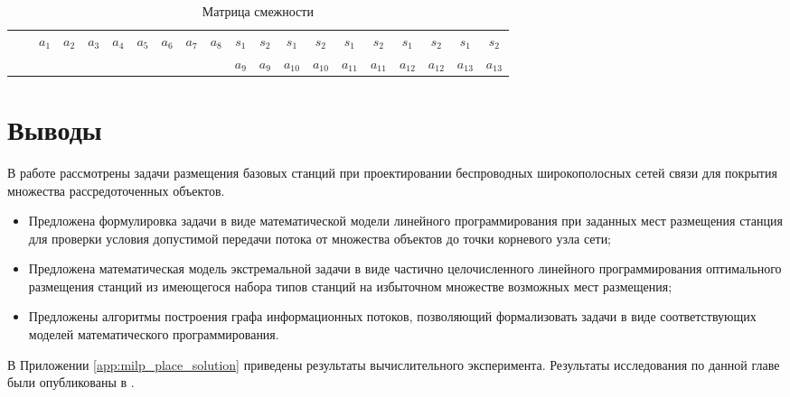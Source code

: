 \fontsize{10pt}{10pt}\selectfont
\begin{longtable}[c]{| c | c|| c | c | c | c|  c|  c|  c|  c|  c|  c|  c|  c|  c|  c|  c|  c|  c|  c|}
    \caption{Матрица смежности}\label{tab:part3_mip_adj_mat}\\

    \hline
    & &\multirow{2}{*}{$a_1$} &\multirow{2}{*}{$a_2$} &	\multirow{2}{*}{$a_3$}& \multirow{2}{*}{$a_4$}&\multirow{2}{*}{$a_5$} &\multirow{2}{*}{$a_6$} &\multirow{2}{*}{$a_7$} &\multirow{2}{*}{$a_8$} & $s_1$& $s_2$& $s_1$& $s_2$& $s_1$& $s_2$& $s_1$& $s_2$& $s_1$& $s_2$  \\

    & & 	& &	& & & & & &$a_9$& $a_9$&$a_{10}$&$a_{10}$& $a_{11}$& $a_{11}$& $a_{12}$& $a_{12}$& $a_{13}$& $a_{13}$  \\
  
    \hline

    \hline \hline
    \hline
\end{longtable}
\normalsize

\section{Выводы}
В работе рассмотрены задачи размещения базовых станций при проектировании беспроводных широкополосных сетей связи для покрытия множества рассредоточенных объектов. 
\begin{itemize}
    \item Предложена формулировка задачи в виде математической модели линейного программирования при заданных мест размещения станция для проверки условия допустимой передачи потока от множества объектов до точки корневого узла сети;
    \item Предложена математическая модель экстремальной задачи в виде частично целочисленного линейного программирования оптимального размещения станций из имеющегося набора типов станций на избыточном множестве возможных мест размещения;
    
    \item Предложены алгоритмы построения графа информационных потоков, позволяющий формализовать задачи в виде соответствующих моделей математического программирования. 
\end{itemize}


В Приложении \cref{app:milp_place_solution} приведены результаты вычислительного эксперимента. Результаты исследования по данной главе были опубликованы в \cite{MukhtarovPershinGUBKIN2018_RSCI, MukhtarovPershinVSPU2019_RSCI, MukhtarovPershinMLSD2019works_RSCI, MukhtarovPershinMLSD2019materials_RSCI,MukhtarovPershinGUBKIN2019_RSCI}. 

\FloatBarrier
